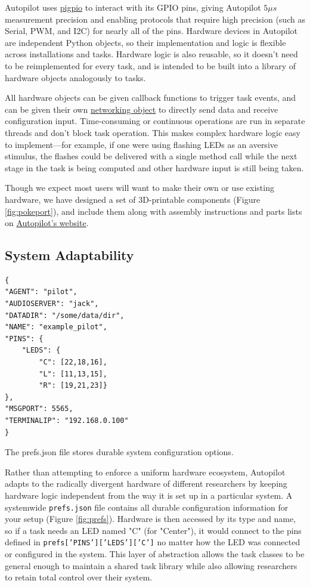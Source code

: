 Autopilot uses \href{http://abyz.me.uk/rpi/pigpio/}{pigpio} to interact with its GPIO pins, giving Autopilot $5 \mu s$ measurement precision and enabling protocols that require high precision (such as Serial, PWM, and I2C) for nearly all of the pins. Hardware devices in Autopilot are independent Python objects, so their implementation and logic is flexible across installations and tasks. Hardware logic is also reusable, so it doesn't need to be reimplemented for every task, and is intended to be built into a library of hardware objects analogously to tasks.

All hardware objects can be given callback functions to trigger task events, and can be given their own \hyperref[sec:networking]{networking object} to directly send data and receive configuration input. Time-consuming or continuous operations are run in separate threads and don't block task operation. This makes complex hardware logic easy to implement---for example, if one were using flashing LEDs as an aversive stimulus, the flashes could be delivered with a single method call while the next stage in the task is being computed and other hardware input is still being taken.

Though we expect most users will want to make their own or use existing hardware, we have designed a set of 3D-printable components (Figure \ref{fig:pokeport}), and include them along with assembly instructions and parts lists on \href{https://auto-pi-lot.com/hardware/}{Autopilot's website}. 
\clearpage

\subsection{System Adaptability}

\begin{marginfigure}[0.4cm]
\begin{verbatim}
{
"AGENT": "pilot",
"AUDIOSERVER": "jack",
"DATADIR": "/some/data/dir",
"NAME": "example_pilot",
"PINS": {
    "LEDS": {
        "C": [22,18,16],
        "L": [11,13,15],
        "R": [19,21,23]}
},
"MSGPORT": 5565,
"TERMINALIP": "192.168.0.100"
}
\end{verbatim}
\caption{The prefs.json file stores durable system configuration options.}
\label{fig:prefs}
\end{marginfigure}%

Rather than attempting to enforce a uniform hardware ecosystem, Autopilot adapts to the radically divergent hardware of different researchers by keeping hardware logic independent from the way it is set up in a particular system. A systemwide \texttt{prefs.json} file contains all durable configuration information for your setup (Figure \ref{fig:prefs}). Hardware is then accessed by its type and name, so if a task needs an LED named "C" (for "Center"), it would connect to the pins defined in  \texttt{prefs['PINS']['LEDS']['C']} no matter how the LED was connected or configured in the system. This layer of abstraction allows the task classes to be general enough to maintain a shared task library while also allowing researchers to retain total control over their system. 
 
